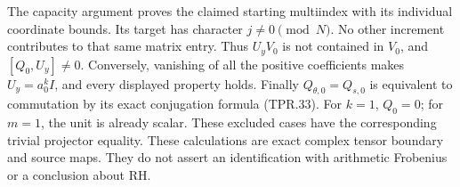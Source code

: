 The capacity argument proves the claimed starting
multiindex with its individual coordinate bounds.
Its target has character \(j\ne0\pmod N\).
No other increment contributes to that same matrix entry.
Thus \(U_yV_0\) is not contained in \(V_0\), and
\([Q_0,U_y]\ne0\).
Conversely, vanishing of all the positive coefficients
makes \(U_y=a_0^kI\), and every displayed property holds.
Finally \(Q_{\theta,0}=Q_{s,0}\) is equivalent to commutation
by its exact conjugation formula (TPR.33).
For \(k=1\), \(Q_0=0\); for \(m=1\), the unit is already
scalar. These excluded cases have the corresponding
trivial projector equality.
These calculations are exact complex tensor boundary and
source maps. They do not assert an identification with
arithmetic Frobenius or a conclusion about RH.
